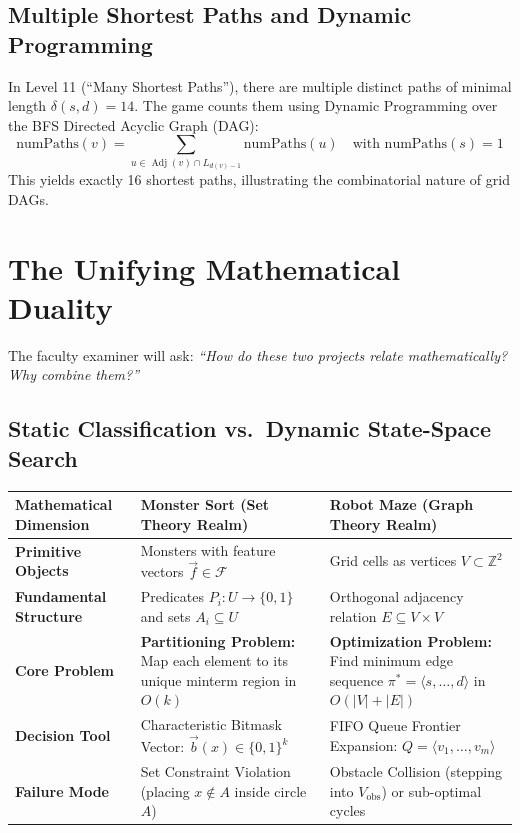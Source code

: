 \documentclass[11pt,a4paper]{article}
\theoremstyle{definition}
\begin{document}
\subsection{Multiple Shortest Paths and Dynamic Programming}
In Level 11 (``Many Shortest Paths''), there are multiple distinct paths of minimal length $\delta(s, d) = 14$. The game counts them using Dynamic Programming over the BFS Directed Acyclic Graph (DAG):
$$\text{numPaths}(v) = \sum_{u \in \operatorname{Adj}(v) \cap L_{d(v)-1}} \text{numPaths}(u) \quad \text{with } \text{numPaths}(s) = 1$$
This yields exactly 16 shortest paths, illustrating the combinatorial nature of grid DAGs.

\newpage
\section{The Unifying Mathematical Duality}

The faculty examiner will ask: \textit{``How do these two projects relate mathematically? Why combine them?''}

\subsection{Static Classification vs.\ Dynamic State-Space Search}
\begin{table}[htbp]
\centering
\small
\begin{tabularx}{\textwidth}{@{}P{3.5cm}Y Y@{}}
\toprule
\textbf{Mathematical Dimension} & \textbf{Monster Sort (Set Theory Realm)} & \textbf{Robot Maze (Graph Theory Realm)} \\
\midrule
\textbf{Primitive Objects} & Monsters with feature vectors $\vec{f} \in \mathcal{F}$ & Grid cells as vertices $V \subset \mathbb{Z}^2$ \\
\textbf{Fundamental Structure} & Predicates $P_i : U \to \{0, 1\}$ and sets $A_i \subseteq U$ & Orthogonal adjacency relation $E \subseteq V \times V$ \\
\textbf{Core Problem} & \textbf{Partitioning Problem:} Map each element to its unique minterm region in $O(k)$ & \textbf{Optimization Problem:} Find minimum edge sequence $\pi^* = \langle s, \dots, d \rangle$ in $O(|V|+|E|)$ \\
\textbf{Decision Tool} & Characteristic Bitmask Vector: $\vec{b}(x) \in \{0, 1\}^k$ & FIFO Queue Frontier Expansion: $Q = \langle v_1, \dots, v_m \rangle$ \\
\textbf{Failure Mode} & Set Constraint Violation (placing $x \notin A$ inside circle $A$) & Obstacle Collision (stepping into $V_{\text{obs}}$) or sub-optimal cycles \\
\bottomrule
\end{tabularx}
\end{table}
\end{document}
